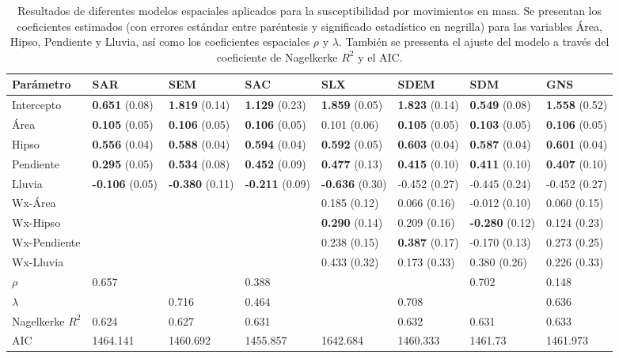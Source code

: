 \documentclass[
  manuscript=article,  
  layout=preprint,  
  year=2023,
  volume=0,
]{format}
\begin{document}
\begin{table}[ht]
\centering
\begin{tabular}{llllllll}
   \hline
 Parámetro & SAR & SEM & SAC & SLX & SDEM & SDM & GNS \\ 
  \hline
Intercepto & \textbf{0.651} (0.08) & \textbf{1.819} (0.14) & \textbf{1.129} (0.23) & \textbf{1.859} (0.05) & \textbf{1.823} (0.14) & \textbf{0.549} (0.08) & \textbf{1.558} (0.52) \\ 
  Área & \textbf{0.105} (0.05) & \textbf{0.106} (0.05) & \textbf{0.106} (0.05) & 0.101 (0.06) & \textbf{0.105} (0.05) & \textbf{0.103} (0.05) & \textbf{0.106} (0.05) \\ 
  Hipso & \textbf{0.556} (0.04) & \textbf{0.588} (0.04) & \textbf{0.594} (0.04) & \textbf{0.592} (0.05) & \textbf{0.603} (0.04) & \textbf{0.587} (0.04) & \textbf{0.601} (0.04) \\ 
  Pendiente & \textbf{0.295} (0.05) & \textbf{0.534} (0.08) & \textbf{0.452} (0.09) & \textbf{0.477} (0.13) & \textbf{0.415} (0.10) & \textbf{0.411} (0.10) & \textbf{0.407} (0.10) \\ 
  Lluvia & \textbf{-0.106} (0.05) & \textbf{-0.380} (0.11) & \textbf{-0.211} (0.09) & \textbf{-0.636} (0.30) & -0.452 (0.27) & -0.445 (0.24) & -0.452 (0.27) \\ 
     \hline
  Wx-Área &  &  &  & 0.185 (0.12) & 0.066 (0.16) & -0.012 (0.10) & 0.060 (0.15) \\ 
  Wx-Hipso &  &  &  & \textbf{0.290} (0.14) & 0.209 (0.16) & \textbf{-0.280} (0.12) & 0.124 (0.23) \\ 
Wx-Pendiente &  &  &  & 0.238 (0.15) & \textbf{0.387} (0.17) & -0.170 (0.13) & 0.273 (0.25) \\ 
  Wx-Lluvia &  &  &  & 0.433 (0.32) & 0.173 (0.33) & 0.380 (0.26) & 0.226 (0.33) \\ 
   \hline
$\rho$ & 0.657 &  & 0.388 &  &  & 0.702 & 0.148 \\ 
  $\lambda$ &  & 0.716 & 0.464 &  & 0.708 &  & 0.636 \\ 
  Nagelkerke $R^2$ & 0.624 & 0.627 & 0.631 &  & 0.632 & 0.631 & 0.633 \\ 
  AIC & 1464.141 & 1460.692 & 1455.857 & 1642.684 & 1460.333 & 1461.73 & 1461.973 \\ 
     \hline
  \end{tabular}
\caption{Resultados de diferentes modelos espaciales aplicados para la susceptibilidad por movimientos en masa. Se presentan los coeficientes estimados (con errores estándar entre paréntesis y significado estadístico en negrilla) para las variables Área, Hipso, Pendiente y Lluvia, así como los coeficientes espaciales $\rho$ y $\lambda$. También se pressenta el ajuste del modelo a través del coeficiente de Nagelkerke $R^2$ y el AIC.} 
\label{tab:spatial_models}
\end{table}
\end{document}
